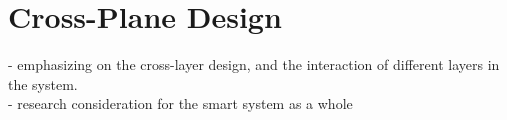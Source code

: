 
\section{Cross-Plane Design}



- emphasizing on the cross-layer design, and the interaction of different layers in the system. \\
- research consideration for the smart system as a whole

